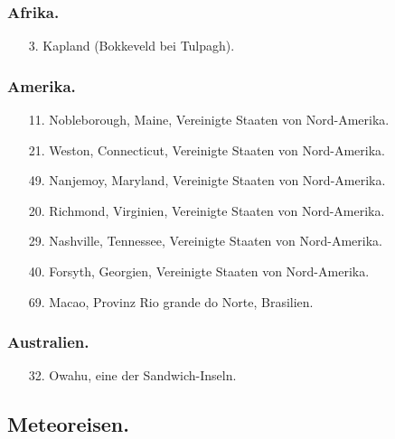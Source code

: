 \documentclass[a4paper, 11pt, oneside, polutonikogreek, german]{article}
\begin{document}
\subsubsection{Afrika.}
\begin{itemize}
    \small
    \item[3.] Kapland (Bokkeveld bei Tulpagh).
\end{itemize}
\subsubsection{Amerika.}
\begin{itemize}
    \small
    \item[11.] Nobleborough, Maine, Vereinigte Staaten von Nord-Amerika.
    \item[21.] Weston, Connecticut, Vereinigte Staaten von Nord-Amerika.
    \item[49.] Nanjemoy, Maryland, Vereinigte Staaten von Nord-Amerika.
    \item[20.] Richmond, Virginien, Vereinigte Staaten von Nord-Amerika.
    \item[29.] Nashville, Tennessee, Vereinigte Staaten von Nord-Amerika.
    \item[40.] Forsyth, Georgien, Vereinigte Staaten von Nord-Amerika.
    \item[69.] Macao, Provinz Rio grande do Norte, Brasilien.
\end{itemize}
\subsubsection{Australien.}
\begin{itemize}
    \small
    \item[32.] Owahu, eine der Sandwich-Inseln.
\end{itemize}
\subsection{Meteoreisen.}
\end{document}
